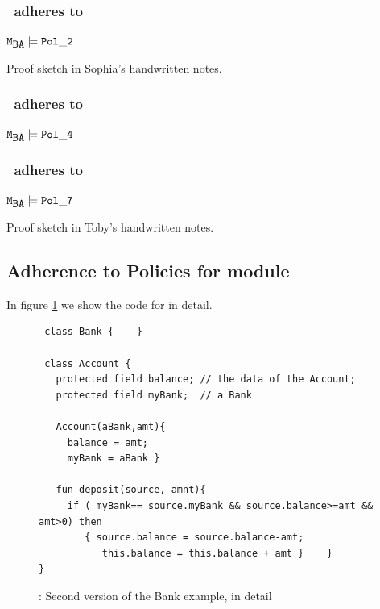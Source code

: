 \documentclass[acmsmall,screen]{acmart}
\begin{document}
\subsubsection{\MOne~adheres to }
\begin{lemma}
${{\mbox{\tt{M}}}_{{\mbox{\tt{BA}}}}} \models {\ensuremath{{\mbox{\tt{Pol}}}\_{{\mbox{\tt{2}}}}}}$
\end{lemma}
Proof sketch   in Sophia's handwritten notes.

\subsubsection{\MOne~adheres to }

\begin{lemma}
${{\mbox{\tt{M}}}_{{\mbox{\tt{BA}}}}} \models {\ensuremath{{\mbox{\tt{Pol}}}\_{{\mbox{\tt{4}}}}}}$
\end{lemma}

\subsubsection{\MOne~adheres to }

\begin{lemma}
${{\mbox{\tt{M}}}_{{\mbox{\tt{BA}}}}} \models {\ensuremath{{\mbox{\tt{Pol}}}\_{{\mbox{\tt{7}}}}}}$
\end{lemma}
Proof sketch  in Toby's handwritten notes.

\subsection{Adherence to Policies for module \MTwo}
\label{section:Adherence:ModuleTwo}

In figure \ref{fig:BankDetailedTwo} we show the  code for \MTwo in detail.

\begin{figure}[tbp]
\begin{lstlisting}
 class Bank {    }

 class Account {
   protected field balance; // the data of the Account;
   protected field myBank;  // a Bank

   Account(aBank,amt){
     balance = amt;
     myBank = aBank }

   fun deposit(source, amnt){
     if ( myBank== source.myBank && source.balance>=amt && amt>0) then
        { source.balance = source.balance-amt;
           this.balance = this.balance + amt }    }
}

\end{lstlisting}
\caption{\MTwo: Second version of the Bank example, in detail}
\label{fig:BankDetailedTwo}
 \end{figure}
\end{document}
